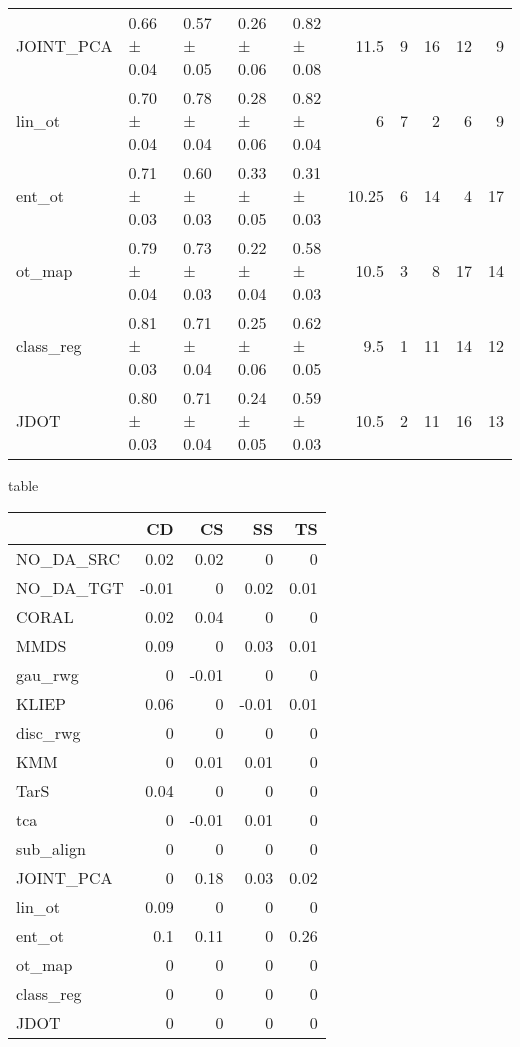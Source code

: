 \begin{tabular}{lllllrrrrr}
 JOINT\_PCA & 0.66 ± 0.04 & 0.57 ± 0.05 & 0.26 ± 0.06 & 0.82 ± 0.08 &         11.5  &                    9 &                     16 &              12 &                   9 \\
 lin\_ot    & 0.70 ± 0.04 & 0.78 ± 0.04 & 0.28 ± 0.06 & 0.82 ± 0.04 &          6    &                    7 &                      2 &               6 &                   9 \\
 ent\_ot    & 0.71 ± 0.03 & 0.60 ± 0.03 & 0.33 ± 0.05 & 0.31 ± 0.03 &         10.25 &                    6 &                     14 &               4 &                  17 \\
 ot\_map    & 0.79 ± 0.04 & 0.73 ± 0.03 & 0.22 ± 0.04 & 0.58 ± 0.03 &         10.5  &                    3 &                      8 &              17 &                  14 \\
 class\_reg & 0.81 ± 0.03 & 0.71 ± 0.04 & 0.25 ± 0.06 & 0.62 ± 0.05 &          9.5  &                    1 &                     11 &              14 &                  12 \\
 JDOT      & 0.80 ± 0.03 & 0.71 ± 0.04 & 0.24 ± 0.05 & 0.59 ± 0.03 &         10.5  &                    2 &                     11 &              16 &                  13 \\
\hline
\end{tabular}

\subsectionDelta table\begin{tabular}{lrrrr}
\hline
           &    CD &    CS &    SS &   TS \\
\hline
 NO\_DA\_SRC &  0.02 &  0.02 &  0    & 0    \\
 NO\_DA\_TGT & -0.01 &  0    &  0.02 & 0.01 \\
 CORAL     &  0.02 &  0.04 &  0    & 0    \\
 MMDS      &  0.09 &  0    &  0.03 & 0.01 \\
 gau\_rwg   &  0    & -0.01 &  0    & 0    \\
 KLIEP     &  0.06 &  0    & -0.01 & 0.01 \\
 disc\_rwg  &  0    &  0    &  0    & 0    \\
 KMM       &  0    &  0.01 &  0.01 & 0    \\
 TarS      &  0.04 &  0    &  0    & 0    \\
 tca       &  0    & -0.01 &  0.01 & 0    \\
 sub\_align &  0    &  0    &  0    & 0    \\
 JOINT\_PCA &  0    &  0.18 &  0.03 & 0.02 \\
 lin\_ot    &  0.09 &  0    &  0    & 0    \\
 ent\_ot    &  0.1  &  0.11 &  0    & 0.26 \\
 ot\_map    &  0    &  0    &  0    & 0    \\
 class\_reg &  0    &  0    &  0    & 0    \\
 JDOT      &  0    &  0    &  0    & 0    \\
\hline
\end{tabular}


